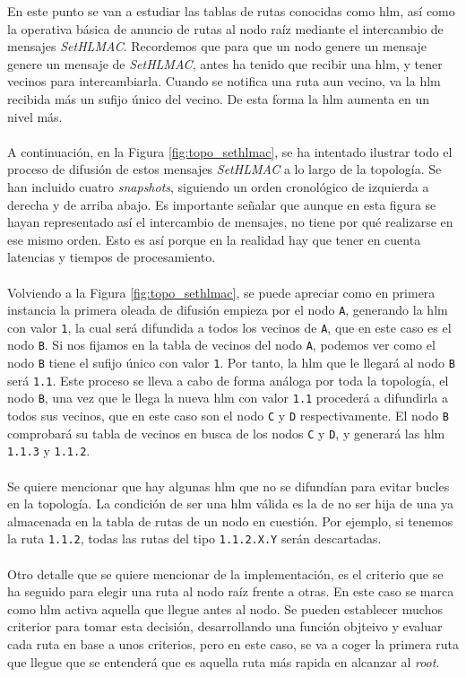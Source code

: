 En este punto se van a estudiar las tablas de rutas conocidas como \gls{hlm}, así como la operativa básica de anuncio de rutas al nodo raíz mediante el intercambio de mensajes \textit{SetHLMAC}. Recordemos que para que un nodo genere un mensaje genere un mensaje de \textit{SetHLMAC}, antes ha tenido que recibir una \gls{hlm}, y tener vecinos para intercambiarla. Cuando se notifica una ruta aun vecino, va la \gls{hlm} recibida más un sufijo único del vecino. De esta forma la \gls{hlm} aumenta en un nivel más.\\
\\
A continuación, en la Figura \ref{fig:topo_sethlmac}, se ha intentado ilustrar todo el proceso de difusión de estos mensajes \textit{SetHLMAC} a lo largo de la topología. Se han incluido cuatro \textit{snapshots}, siguiendo un orden cronológico de izquierda a derecha y de arriba abajo. Es importante señalar que aunque en esta figura se hayan representado así el intercambio de mensajes, no tiene por qué realizarse en ese mismo orden. Esto es así porque en la realidad hay que tener en cuenta latencias y tiempos de procesamiento.\\
\\
Volviendo a la Figura \ref{fig:topo_sethlmac}, se puede apreciar como en primera instancia la primera oleada de difusión empieza por el nodo \texttt{A}, generando la \gls{hlm} con valor \texttt{1}, la cual será difundida a todos los vecinos de \texttt{A}, que en este caso es el nodo \texttt{B}. Si nos fijamos en la tabla de vecinos del nodo \texttt{A}, podemos ver como el nodo \texttt{B} tiene el sufijo único con valor \texttt{1}. Por tanto, la \gls{hlm} que le llegará al nodo \texttt{B} será \texttt{1.1}. Este proceso se lleva a cabo de forma análoga por toda la topología, el nodo \texttt{B}, una vez que le llega la nueva \gls{hlm} con valor \texttt{1.1} procederá a difundirla a todos sus vecinos, que en este caso son el nodo \texttt{C} y \texttt{D} respectivamente. El nodo \texttt{B} comprobará su tabla de vecinos en busca de los  nodos \texttt{C} y \texttt{D}, y generará las \gls{hlm} \texttt{1.1.3} y \texttt{1.1.2}.\\
\\
Se quiere mencionar que hay algunas \gls{hlm} que no se difundían para evitar bucles en la topología.  La condición de ser una \gls{hlm} válida es la de no ser hija de una ya almacenada en la tabla de rutas de un nodo en cuestión. Por ejemplo, si tenemos la ruta \texttt{1.1.2}, todas las rutas del tipo \texttt{1.1.2.X.Y} serán descartadas.\\
\\
Otro detalle que se quiere mencionar de la implementación, es el criterio que se ha seguido para elegir una ruta al nodo raíz frente a otras. En este caso se marca como \gls{hlm} activa aquella que llegue antes al nodo. Se pueden establecer muchos criterior para tomar esta decisión, desarrollando una función objteivo y evaluar cada ruta en base a unos criterios, pero en este caso, se va a coger la primera ruta que llegue que se entenderá que es aquella ruta más rapida en alcanzar al \textit{root}.\\

